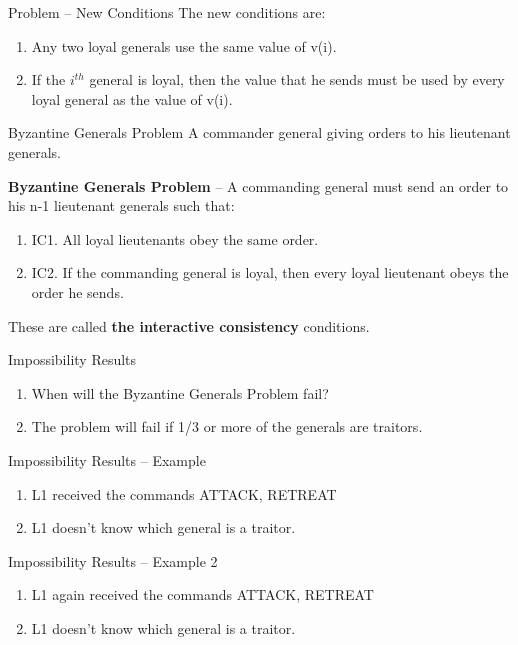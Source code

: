 \documentclass[11pt]{beamer}
\begin{document}
\begin{frame}{Problem – New Conditions}
	The new conditions are:
	\begin{enumerate}
		\item Any two loyal generals use the same value of v(i). 
		\item If the $i^{th}$ general is loyal, then the value that he sends must be used by every loyal general as the value of v(i). 
	\end{enumerate}
\end{frame}

\begin{frame}{Byzantine Generals Problem}
	A commander general giving orders to his lieutenant generals.

\textbf{Byzantine Generals Problem} – A commanding general must send an order to his n-1 lieutenant generals such that:
	\begin{enumerate}
		\item {\color{red} IC1}. All loyal lieutenants obey the same order.
		\item {\color{red}IC2}. If the commanding general is loyal, then every loyal lieutenant obeys the order he sends.
	\end{enumerate}
These are called \textbf{the interactive consistency} conditions.
\end{frame}

\begin{frame}{Impossibility Results}
	\begin{enumerate}
		\item When will the Byzantine Generals Problem fail?
		\item The problem will fail if 1/3 or more of the generals are traitors.
	\end{enumerate}
\end{frame}

\begin{frame}{Impossibility Results – Example}
	\begin{enumerate}
		\item L1 received the commands ATTACK, RETREAT
		\item L1 doesn’t know which general is a traitor.
	\end{enumerate}
\end{frame}

\begin{frame}{Impossibility Results – Example 2}
	\begin{enumerate}
		\item L1 again received the commands ATTACK, RETREAT
		\item L1 doesn’t know which general is a traitor.
	\end{enumerate}
\end{frame}
\end{document}
